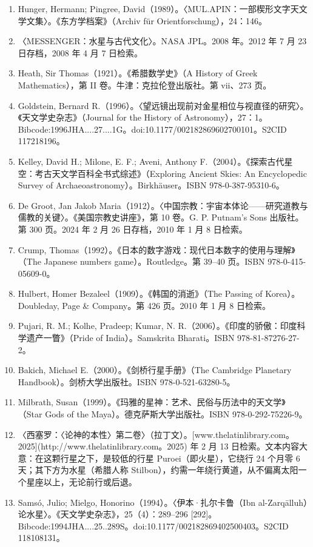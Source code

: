 \begin{enumerate}
    \item Hunger, Hermann; Pingree, David（1989）。〈MUL.APIN：一部楔形文字天文学文集〉。《东方学档案》（Archiv für Orientforschung），24：146。
    \item 〈MESSENGER：水星与古代文化〉。NASA JPL。2008 年。2012 年 7 月 23 日存档，2008 年 4 月 7 日检索。
    \item Heath, Sir Thomas（1921）。《希腊数学史》（A History of Greek Mathematics），第 II 卷。牛津：克拉伦登出版社。第 vii、273 页。
    \item Goldstein, Bernard R.（1996）。〈望远镜出现前对金星相位与视直径的研究〉。《天文学史杂志》（Journal for the History of Astronomy），27：1。Bibcode:1996JHA....27....1G。doi:10.1177/002182869602700101。S2CID 117218196。
    \item Kelley, David H.; Milone, E. F.; Aveni, Anthony F.（2004）。《探索古代星空：考古天文学百科全书式综述》（Exploring Ancient Skies: An Encyclopedic Survey of Archaeoastronomy）。Birkhäuser。ISBN 978-0-387-95310-6。
    \item De Groot, Jan Jakob Maria（1912）。〈中国宗教：宇宙本体论——研究道教与儒教的关键〉。《美国宗教史讲座》，第 10 卷。G. P. Putnam’s Sons 出版社。第 300 页。2024 年 2 月 26 日存档，2010 年 1 月 8 日检索。
    \item Crump, Thomas（1992）。《日本的数字游戏：现代日本数字的使用与理解》（The Japanese numbers game）。Routledge。第 39–40 页。ISBN 978-0-415-05609-0。
    \item Hulbert, Homer Bezaleel（1909）。《韩国的消逝》（The Passing of Korea）。Doubleday, Page & Company。第 426 页。2010 年 1 月 8 日检索。
    \item Pujari, R. M.; Kolhe, Pradeep; Kumar, N. R.（2006）。《印度的骄傲：印度科学遗产一瞥》（Pride of India）。Samskrita Bharati。ISBN 978-81-87276-27-2。
    \item Bakich, Michael E.（2000）。《剑桥行星手册》（The Cambridge Planetary Handbook）。剑桥大学出版社。ISBN 978-0-521-63280-5。
    \item Milbrath, Susan（1999）。《玛雅的星神：艺术、民俗与历法中的天文学》（Star Gods of the Maya）。德克萨斯大学出版社。ISBN 978-0-292-75226-9。
    \item 〈西塞罗：〈论神的本性〉第二卷〉（拉丁文）。[www.thelatinlibrary.com。2025](http://www.thelatinlibrary.com。2025) 年 2 月 13 日检索。文本内容大意：在这颗行星之下，是较低的行星 Puroei（即火星），它绕行 24 个月零 6 天；其下方为水星（希腊人称 Stilbon），约需一年绕行黄道，从不偏离太阳一个星座以上，无论前行或后退。
    \item Samsó, Julio; Mielgo, Honorino（1994）。〈伊本·扎尔卡鲁（Ibn al-Zarqālluh）论水星〉。《天文学史杂志》，25（4）：289–296 [292]。Bibcode:1994JHA....25..289S。doi:10.1177/002182869402500403。S2CID 118108131。

\end{enumerate}

